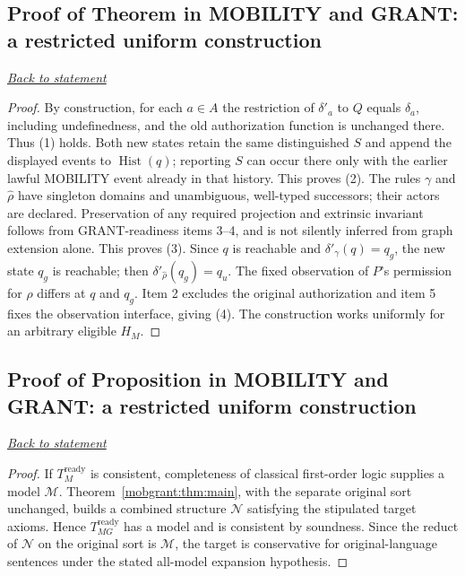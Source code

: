 \documentclass[11pt,letterpaper]{article}
\theoremstyle{definition}\newtheorem{definition}[theorem]{Definition}\newtheorem{example}[theorem]{Example}
\theoremstyle{remark}\newtheorem{remark}[theorem]{Remark}
\newcommand{\backlink}[1]{\noindent\hyperref[#1]{\textit{Back to statement}}\par\smallskip}
\providecommand{\Hist}{\operatorname{Hist}}
\begin{document}
\subsection{Proof of Theorem in MOBILITY and GRANT: a restricted uniform construction}\label{br:mobgrant:proof:1}\backlink{br:mobgrant:stmt:1}
\begin{proof}
By construction, for each $a\in A$ the restriction of $\delta'_a$ to $Q$ equals $\delta_a$, including undefinedness, and the old authorization function is unchanged there. Thus (1) holds. Both new states retain the same distinguished $S$ and append the displayed events to $\Hist(q)$; reporting $S$ can occur there only with the earlier lawful MOBILITY event already in that history. This proves (2). The rules $\gamma$ and $\widehat\rho$ have singleton domains and unambiguous, well-typed successors; their actors are declared. Preservation of any required projection and extrinsic invariant follows from GRANT-readiness items 3--4, and is not silently inferred from graph extension alone. This proves (3). Since $q$ is reachable and $\delta'_{\gamma}(q)=q_g$, the new state $q_g$ is reachable; then $\delta'_{\widehat\rho}(q_g)=q_u$. The fixed observation of $P$'s permission for $\rho$ differs at $q$ and $q_g$. Item 2 excludes the original authorization and item 5 fixes the observation interface, giving (4). The construction works uniformly for an arbitrary eligible $H_M$.
\end{proof}

\subsection{Proof of Proposition in MOBILITY and GRANT: a restricted uniform construction}\label{br:mobgrant:proof:2}\backlink{br:mobgrant:stmt:2}
\begin{proof}
If $T_M^{\mathrm{ready}}$ is consistent, completeness of classical first-order logic supplies a model $\mathcal M$. Theorem~\ref{mobgrant:thm:main}, with the separate original sort unchanged, builds a combined structure $\mathcal N$ satisfying the stipulated target axioms. Hence $T_{MG}^{\mathrm{ready}}$ has a model and is consistent by soundness. Since the reduct of $\mathcal N$ on the original sort is $\mathcal M$, the target is conservative for original-language sentences under the stated all-model expansion hypothesis.
\end{proof}
\end{document}
